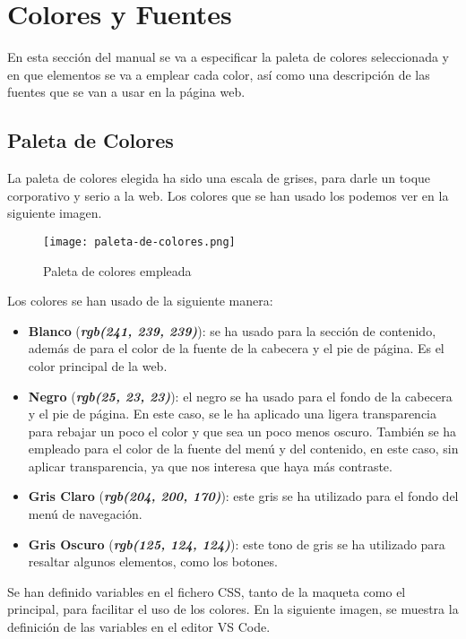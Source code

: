 \section{Colores y Fuentes}
En esta sección del manual se va a especificar la paleta de colores seleccionada y en que elementos se va a emplear cada color, así como una descripción de las fuentes que se van a usar en la página web.

\subsection{Paleta de Colores}
La paleta de colores elegida ha sido una escala de grises, para darle un toque corporativo y serio a la web. Los colores que se han usado los podemos ver en la siguiente imagen.

\begin{figure}[H]
    \centering
    \texttt{[image: paleta-de-colores.png]}
    \caption{Paleta de colores empleada}
\end{figure}

Los colores se han usado de la siguiente manera:

\begin{itemize}
    \item \textbf{Blanco} (\textbf{\textit{rgb(241, 239, 239)}}): se ha usado para la sección de contenido, además de para el color de la fuente de la cabecera y el pie de página. Es el color principal de la web.

    \item \textbf{Negro} (\textbf{\textit{rgb(25, 23, 23)}}): el negro se ha usado para el fondo de la cabecera y el pie de página. En este caso, se le ha aplicado una ligera transparencia para rebajar un poco el color y que sea un poco menos oscuro. También se ha empleado para el color de la fuente del menú y del contenido, en este caso, sin aplicar transparencia, ya que nos interesa que haya más contraste.

    \item \textbf{Gris Claro} (\textbf{\textit{rgb(204, 200, 170)}}): este gris se ha utilizado para el fondo del menú de navegación.

    \item \textbf{Gris Oscuro} (\textbf{\textit{rgb(125, 124, 124)}}): este tono de gris se ha utilizado para resaltar algunos elementos, como los botones.
\end{itemize}

Se han definido variables en el fichero CSS, tanto de la maqueta como el principal, para facilitar el uso de los colores. En la siguiente imagen, se muestra la definición de las variables en el editor VS Code.

